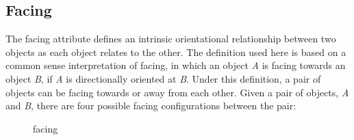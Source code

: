\documentclass[12pt]{ucthesis}
\begin{document}
\subsection{Facing}
The facing attribute defines an intrinsic orientational relationship between two objects as each object relates to the other. The definition used here is based on a common sense interpretation of facing, in which an object \emph{A} is facing towards an object \emph{B}, if \emph{A} is directionally oriented at \emph{B}. Under this definition, a pair of objects can be facing towards or away from each other. Given a pair of objects, \emph{A} and \emph{B}, there are four possible facing configurations between the pair: 

\begin{figure}[H]
 \centering
 \hspace{10 mm}
  \hspace{10 mm}
 \hspace{10 mm}
 \caption{facing}
\label{display-arrangement}
\end{figure}
\end{document}
